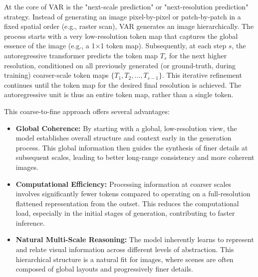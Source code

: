 \documentclass{article}
\begin{document}
At the core of VAR is the "next-scale prediction" or "next-resolution prediction" strategy. Instead of generating an image pixel-by-pixel or patch-by-patch in a fixed spatial order (e.g., raster scan), VAR generates an image hierarchically. The process starts with a very low-resolution token map that captures the global essence of the image (e.g., a 1$\times$1 token map). Subsequently, at each step $s$, the autoregressive transformer predicts the token map $T_s$ for the next higher resolution, conditioned on all previously generated (or ground-truth, during training) coarser-scale token maps $\{T_1, T_2, \ldots, T_{s-1}\}$. This iterative refinement continues until the token map for the desired final resolution is achieved. The autoregressive unit is thus an entire token map, rather than a single token.

This coarse-to-fine approach offers several advantages:
\begin{itemize}[leftmargin=*,itemsep=2pt,topsep=3pt]
    \item \textbf{Global Coherence:} By starting with a global, low-resolution view, the model establishes overall structure and context early in the generation process. This global information then guides the synthesis of finer details at subsequent scales, leading to better long-range consistency and more coherent images.
    \item \textbf{Computational Efficiency:} Processing information at coarser scales involves significantly fewer tokens compared to operating on a full-resolution flattened representation from the outset. This reduces the computational load, especially in the initial stages of generation, contributing to faster inference.
    \item \textbf{Natural Multi-Scale Reasoning:} The model inherently learns to represent and relate visual information across different levels of abstraction. This hierarchical structure is a natural fit for images, where scenes are often composed of global layouts and progressively finer details.
\end{itemize}
\end{document}

